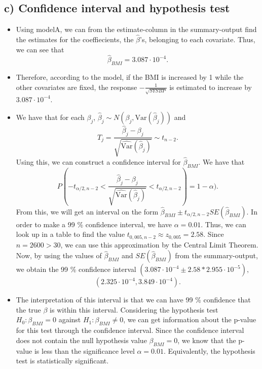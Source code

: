 \documentclass[]{article}
\begin{document}
\subsection{c) Confidence interval and hypothesis
test}\label{c-confidence-interval-and-hypothesis-test}

\begin{itemize}
\item
  Using modelA, we can from the estimate-column in the summary-output
  find the estimates for the coeffiecients, the \(\hat{\beta}\)'s,
  belonging to each covariate. Thus, we can see that
  \[\hat{\beta}_{BMI}=3.087\cdot10^{-4}.\]
\item
  Therefore, according to the model, if the BMI is increased by 1 while
  the other covariates are fixed, the response
  \(-\frac{1}{\sqrt{SYSBP}}\) is estimated to increase by
  \(3.087\cdot10^{-4}\).
\item
  We have that for each \(\beta_j\),
  \(\hat{\beta}_j \sim N(\beta_j,\text{Var}(\hat{\beta}_j))\) and
  \[T_j =\frac{\hat{\beta}_j-\beta_j}{\sqrt{\widehat{\text{Var}}(\hat{\beta}_j)}} \sim t_{n-2}.\]
  Using this, we can construct a confidence interval for
  \(\hat{\beta}_{BMI}\). We have that
  \[P(-t_{\alpha/2,n-2} < \frac{\hat{\beta}_j-\beta_j}{\sqrt{\widehat{\text{Var}}(\hat{\beta}_j)}} < t_{\alpha/2,n-2}) = 1 - \alpha).\]
  From this, we will get an interval on the form
  \(\hat{\beta}_{BMI} \pm t_{\alpha/2,n-2}SE(\hat{\beta}_{BMI})\). In
  order to make a 99 \% confidence interval, we have \(\alpha=0.01\).
  Thus, we can look up in a table to find the value
  \(t_{0,005,n-2} \approx z_{0,005} = 2.58\). Since \(n=2600 > 30\), we
  can use this approximation by the Central Limit Theorem. Now, by using
  the values of \(\hat{\beta}_{BMI}\) and \(SE(\hat{\beta}_{BMI})\) from
  the summary-output, we obtain the 99 \% confidence interval
  \((3.087 \cdot 10^{-4} \pm 2.58 * 2.955 \cdot 10^{-5}),\)
  \[(2.325 \cdot 10^{-4}, 3.849 \cdot 10^{-4}).\]
\item
  The interpretation of this interval is that we can have 99 \%
  confidence that the true \(\beta\) is within this interval.
  Considering the hypothesis test \(H_0: \beta_{BMI} = 0\) against
  \(H_1: \beta_{BMI} \neq 0\), we can get information about the p-value
  for this test through the confidence interval. Since the confidence
  interval does not contain the null hypothesis value \(\beta_{BMI}=0\),
  we know that the p-value is less than the significance level
  \(\alpha = 0.01\). Equivalently, the hypothesis test is statistically
  significant.
\end{itemize}
\end{document}

